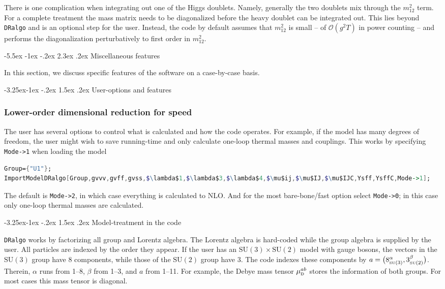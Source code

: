 \documentclass[11pt]{article}
\makeatletter
\def\dralgo{{\tt DRalgo}}
\newcommand{\rmii}[1]{{\mbox{\tiny\rm{#1}}}}
\renewcommand\section{\@startsection{section}{1}{\z@}%
  {-5.5ex \@plus -1ex \@minus -.2ex}%
  {2.3ex \@plus.2ex}%
  {\normalfont\large\bfseries}}
\renewcommand\subsection{\@startsection{subsection}{2}{\z@}%
  {-3.25ex\@plus -1ex \@minus -.2ex}%
  {1.5ex \@plus .2ex}%
  {\normalfont\normalsize\bfseries}}
\makeatother
\begin{document}
There is one complication when integrating out one of the Higgs doublets. Namely, generally the two doublets mix through the $m_{12}^2$ term.
For a complete treatment the mass matrix needs to be diagonalized before the heavy doublet can be integrated out.
This lies beyond \dralgo{} and is an optional step for the user.
Instead,
the code by default assumes that $m_{12}^2$ is small --
of $\mathcal{O}(g^2T)$ in power counting -- and performs 
the diagonalization perturbatively to first order in $m_{12}^2$.

%
\section{Miscellaneous features}

In this section,
we discuss specific features of the software on a case-by-case basis.

\subsection{User-options and features}


\subsubsection*{Lower-order dimensional reduction for speed}
The user has several options to control what is calculated and how the code operates. 
For example, if the model has many degrees of freedom,
the user might wish to save running-time and only calculate one-loop thermal masses and couplings.
This works by specifying {\tt Mode->1} when loading the model
\begin{lstlisting}[language=Mathematica,mathescape=true]
Group={"U1"};
ImportModelDRalgo[Group,gvvv,gvff,gvss,$\lambda$1,$\lambda$3,$\lambda$4,$\mu$ij,$\mu$IJ,$\mu$IJC,Ysff,YsffC,Mode->1];
\end{lstlisting}
The default is
{\tt Mode->2}, in which case everything is calculated to NLO.
And for the most bare-bone/fast option select
{\tt Mode->0}; in this case only one-loop thermal masses are calculated. 


%
\subsection{Model-treatment in the code}

\dralgo{} works by factorizing all group and Lorentz algebra.
The Lorentz algebra is hard-coded while the group algebra is supplied by the user.
All particles are indexed by the order they appear.
If the user has an
$
\mathrm{SU}(3)\times
\mathrm{SU}(2)$ model with gauge bosons,
the vectors in
the $\mathrm{SU}(3)$ group have 8 components, while those of
the $\mathrm{SU}(2)$ group have 3.
The code indexes these components by
$a=\bigl(8^\alpha_{\rmii{SU}(3)},3^\beta_{\rmii{SU}(2)}\bigr)$.
Therein,
$\alpha$ runs from 1--8,
$\beta$ from 1--3, and
$a$ from 1--11.
For example,
the Debye mass tensor $\mu_{\rmii{D}}^{ab}$
stores the information of both groups.
For most cases this mass tensor is diagonal.
\end{document}
